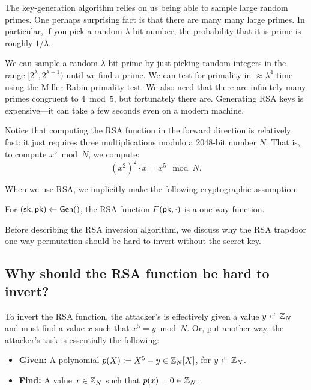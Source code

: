 \begin{remark}
The key-generation algorithm relies on us being able
to sample large random primes.
One perhaps surprising fact is that there are many many 
large primes.
In particular, if you pick a random $\lambda$-bit number,
the probability that it is prime is roughly $1/\lambda$.

We can sample a random $\lambda$-bit prime by just
picking random integers in the range $[2^\lambda, 2^{\lambda + 1})$
until we find a prime.
We can test for primality in $\approx \lambda^4$ time using
the Miller-Rabin primality test.
We also need that there are infinitely many primes congruent to
$4 \bmod 5$, but fortunately there are.
Generating RSA keys is expensive---it can take
a few seconds even on a modern machine.
\end{remark}

Notice that computing the RSA function in the forward direction is
relatively fast: it just requires three multiplications 
modulo a 2048-bit number $N$. That is, to compute $x^5 \bmod N$, we compute:
\[ (x^2)^2 \cdot x = x^5\mod N.\]

When we use RSA, we implicitly make 
the following cryptographic assumption:
\begin{defn}
For $({\mathsf{sk}}, \mathsf{pk}) \gets \mathsf{Gen}()$, 
the RSA function $F(\mathsf{pk}, \cdot)$ is a one-way function.
\end{defn}

\medskip

Before describing the RSA inversion algorithm, we discuss 
why the RSA trapdoor one-way permutation should be hard
to invert without the secret key.

\subsection{Why should the RSA function be hard to invert?}
To invert the RSA function, the attacker's is effectively given
a value $y \getsr \Z_N$ and must find a value $x$ such that $x^5 = y \bmod N$.
Or, put another way, the attacker's task is essentially the following:
\begin{itemize}
  \item \textbf{Given:} A polynomial $p(X) \mathrel{\mathop:}= X^5 - y \in \mathbb{Z}_N[X]$,
                        for $y \getsr \Z_N$.
  \item \textbf{Find:}  A value $x \in \mathbb{Z}_N$ such that $p(x) = 0 \in \mathbb{Z}_N$.
\end{itemize}

